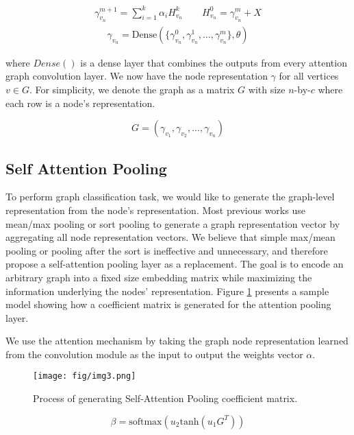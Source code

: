 \documentclass[conference]{IEEEtran}
\begin{document}
		\begin{eqnarray}
		    \gamma_{v_n}^{m+1} = \sum_{i=1}^{k} \alpha_iH^k_{v_n} \qquad H^0_{v_n} = \gamma_{v_n}^{m} + X
\label{eq:eq3a}
	    \end{eqnarray}
		\begin{eqnarray}
			\gamma_{v_n} = \text{Dense}(\lbrace\gamma_{v_n}^0 ,\gamma_{v_n}^1,  ... , \gamma_{v_n}^m\rbrace, \theta)
			\label{eq:eq3}
		\end{eqnarray}
		
		where $Dense()$ is a dense layer that combines the outputs from every attention graph convolution layer.  We now have the node representation $\gamma$ for all vertices $v\in G$. For simplicity, we denote the graph as a matrix $G$ with size $n$-by-$c$ where each row is a node's representation.
		
		$$G = (\gamma_{v_1}, \gamma_{v_2}, ..., \gamma_{v_n})$$	
		
		\subsection{Self Attention Pooling}To perform graph classification task, we would like to generate the graph-level representation from the node's representation. Most previous works use mean/max pooling \cite{henaff2015deep} or sort pooling \cite{defferrard2016convolutional,zhang2018end} to generate a graph representation vector by aggregating all node representation vectors. We believe that simple max/mean pooling or pooling after the sort is ineffective and unnecessary, and therefore propose a self-attention pooling layer as a replacement. The goal is to encode an arbitrary graph into a fixed size embedding matrix while maximizing the information underlying the nodes' representation. Figure \ref{fig:pooling} presents a sample model showing how a coefficient matrix is generated for the attention pooling layer.
		
		We use the attention mechanism by taking the graph node representation learned from the convolution module as the input to output the weights vector $\alpha$. 
		
		\begin{figure}[b]
 	 	\centering
 	 		\texttt{[image: fig/img3.png]}
 	 		\caption{Process of generating Self-Attention Pooling coefficient matrix.}   
 	 	\label{fig:pooling}
		\end{figure}
		
		\begin{equation}
			\beta = \text{softmax}(u_2 \text{tanh}(u_1 G^T))
			\label{eq:alpha}			
		\end{equation}
		
\end{document}
